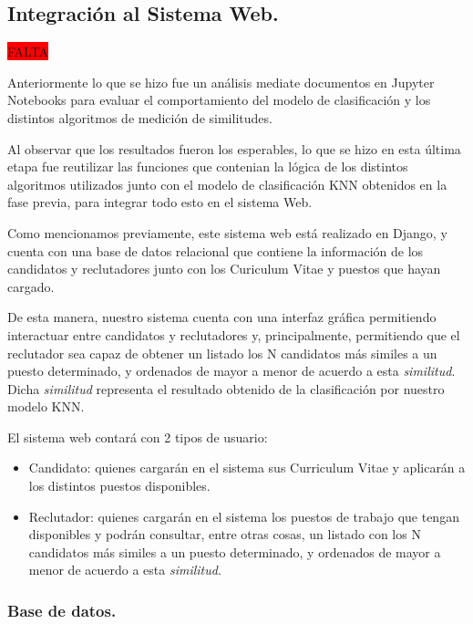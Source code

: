 \documentclass[12pt,a4paper]{article}
\begin{document}
\begin{sloppypar}
\cleardoublepage

\subsection{Integración al Sistema Web.}\label{5.5.IntegracionalSistemaWeb}
\colorbox{red}{FALTA}

Anteriormente lo que se hizo fue un análisis mediate documentos en Jupyter Notebooks para evaluar el comportamiento del modelo de clasificación y los distintos algoritmos de medición de similitudes. 

Al observar que los resultados fueron los esperables, lo que se hizo en esta última etapa fue reutilizar las funciones que contenian la lógica de los distintos algoritmos utilizados junto con el modelo de clasificación KNN obtenidos en la fase previa, para integrar todo esto en el sistema Web. 

Como mencionamos previamente, este sistema web está realizado en Django, y cuenta con una base de datos relacional que contiene la información de los candidatos y reclutadores junto con los Curiculum Vitae y puestos que hayan cargado. 

De esta manera, nuestro sistema cuenta con una interfaz gráfica permitiendo interactuar entre candidatos y reclutadores y, principalmente, permitiendo que el reclutador sea capaz de obtener un listado los N candidatos más similes a un puesto determinado, y ordenados de mayor a menor de acuerdo a esta \textit{similitud}. Dicha \textit{similitud} representa el resultado obtenido de la clasificación por nuestro modelo KNN.

El sistema web contará con 2 tipos de usuario: 
\begin{itemize}
\item Candidato: quienes cargarán en el sistema sus Curriculum Vitae y aplicarán a los distintos puestos disponibles.
\item Reclutador: quienes cargarán en el sistema los puestos de trabajo que tengan disponibles y podrán consultar, entre otras cosas, un listado con los N candidatos más similes a un puesto determinado, y ordenados de mayor a menor de acuerdo a esta \textit{similitud}.
\end{itemize}

\cleardoublepage

\subsubsection{Base de datos.}


\end{sloppypar}
\end{document}
